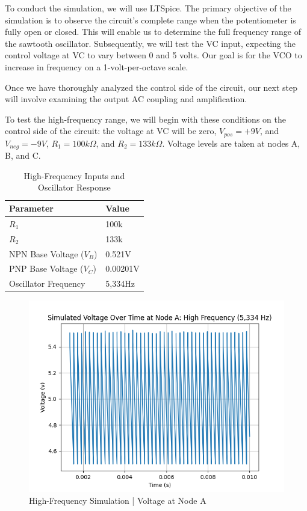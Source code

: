 \documentclass{article}
\begin{document}
To conduct the simulation, we will use LTSpice. The primary objective of the simulation is to observe the circuit's complete range when the potentiometer is fully open or closed. This will enable us to determine the full frequency range of the sawtooth oscillator. Subsequently, we will test the VC input, expecting the control voltage at VC to vary between 0 and 5 volts. Our goal is for the VCO to increase in frequency on a 1-volt-per-octave scale.

Once we have thoroughly analyzed the control side of the circuit, our next step will involve examining the output AC coupling and amplification.

To test the high-frequency range, we will begin with these conditions on the control side of the circuit: the voltage at VC will be zero, $V_{pos} = +9 V$, and $V_{neg} = -9 V$, $R_1 = 100k \Omega$, and $R_2 = 133k \Omega$. Voltage levels are taken at nodes A, B, and C.

\begin{table}[H]
  \centering
  \begin{tabular}{ll}
    \toprule
    Parameter & Value \\
    \midrule
    $R_1$ & 100k \\
    $R_2$ & 133k \\
    NPN Base Voltage ($V_B$) & 0.521V \\
    PNP Base Voltage ($V_C$) & 0.00201V \\
    Oscillator Frequency & 5,334Hz \\
    \bottomrule
  \end{tabular}
  \caption{High-Frequency Inputs and Oscillator Response}
\end{table}
\vspace{-1.5cm}
\begin{figure}[H]
  \centering
  \includegraphics[width=.7\linewidth]{png/Figure_1.png}
  \caption{High-Frequency Simulation | Voltage at Node A}
\end{figure}
\end{document}
